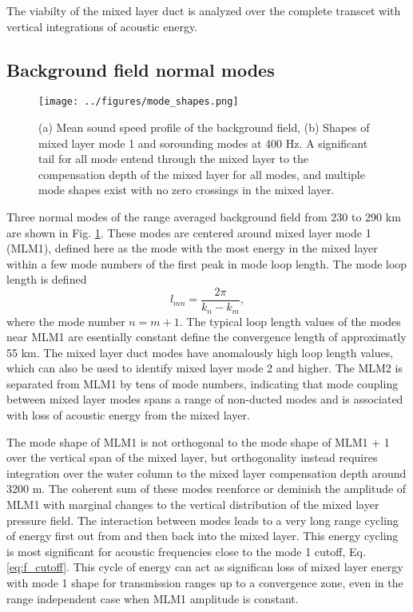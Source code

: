\documentclass[preprint,NumberedRefs]{JASA}
\begin{document}
The viabilty of the mixed layer duct is analyzed over the complete transcet with vertical integrations of acoustic energy.

\subsection{Background field normal modes}
\begin{figure}
\texttt{[image: ../figures/mode\_shapes.png]}
    \caption{\label{fig:bg_modes}{(a) Mean sound speed profile of the background field, (b) Shapes of mixed layer mode 1 and sorounding modes at 400 Hz. A significant tail for all mode entend through the mixed layer to the compensation depth of the mixed layer for all modes, and multiple mode shapes exist with no zero crossings in the mixed layer.}}
\end{figure}

Three normal modes of the range averaged background field from 230 to 290 km are shown in Fig. \ref{fig:bg_modes}. These modes are centered around mixed layer mode 1 (MLM1), defined here as the mode with the most energy in the mixed layer within a few mode numbers of the first peak in mode loop length. The mode loop length is defined
\begin{equation}
    l_{mn} = \frac{2 \pi}{k_n - k_m},
    \label{eq:loop_length}
\end{equation}
where the mode number $n=m+1$. The typical loop length values of the modes near MLM1 are esentially constant define the convergence length of approximatly 55 km. The mixed layer duct modes have anomalously high loop length values, which can also be used to identify mixed layer mode 2 and higher. The MLM2 is separated from MLM1 by tens of mode numbers, indicating that mode coupling between mixed layer modes spans a range of non-ducted modes and is associated with loss of acoustic energy from the mixed layer.

The mode shape of MLM1 is not orthogonal to the mode shape of MLM1 + 1 over the vertical span of the mixed layer, but orthogonality instead requires integration over the water column to the mixed layer compensation depth around 3200 m. The coherent sum of these modes reenforce or deminish the amplitude of MLM1 with marginal changes to the vertical distribution of the mixed layer pressure field. The interaction between modes leads to a very long range cycling of energy first out from and then back into the mixed layer. This energy cycling is most significant for acoustic frequencies close to the mode 1 cutoff, Eq. \eqref{eq:f_cutoff}. This cycle of energy can act as significan loss of mixed layer energy with mode 1 shape for transmission ranges up to a convergence zone, even in the range independent case when MLM1 amplitude is constant.
\end{document}
